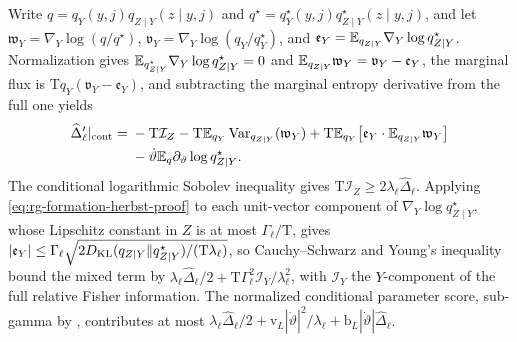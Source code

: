 Write \(q=q_Y(y,j)q_{Z\mid Y}(z\mid y,j)\) and
\(q^\star=q^\star_Y(y,j)q^\star_{Z\mid Y}(z\mid y,j)\), and let
\(\mathfrak w_Y=\nabla_Y\log(q/q^\star)\),
\(\mathfrak v_Y=\nabla_Y\log(q_Y/q^\star_Y)\), and
\(\mathfrak e_Y=\mathbb E_{q_{Z\mid Y}}\nabla_Y\log q^\star_{Z\mid Y}\). Normalization
gives \(\mathbb E_{q^\star_{Z\mid Y}}\nabla_Y\log q^\star_{Z\mid Y}=0\) and
\(\mathbb E_{q_{Z\mid Y}}\mathfrak w_Y=\mathfrak v_Y-\mathfrak e_Y\), the marginal
flux is \(\mathrm Tq_Y(\mathfrak v_Y-\mathfrak e_Y)\), and subtracting the
marginal entropy derivative from the full one yields
\begin{align}
 \widehat\Delta_\ell'|_{\mathrm{cont}}
 ={}&-\mathrm T\mathcal I_Z
      -\mathrm T\mathbb E_{q_Y}\operatorname{Var}_{q_{Z\mid Y}}(\mathfrak w_Y)
      +\mathrm T\mathbb E_{q_Y}\bigl[\mathfrak e_Y\cdot\mathbb E_{q_{Z\mid Y}}\mathfrak w_Y\bigr]
 \notag\\
 &-\dot\vartheta \mathbb E_q\partial_\vartheta\log q^\star_{Z\mid Y}.
 \label{eq:rg-formation-conditional-balance}
\end{align}
The conditional logarithmic Sobolev inequality gives
\(\mathrm T\mathcal I_Z\ge2\lambda_\ell\widehat\Delta_\ell\). Applying
\cref{eq:rg-formation-herbst-proof} to each unit-vector component of
\(\nabla_Y\log q^\star_{Z\mid Y}\), whose Lipschitz constant in \(Z\) is at most
\(\Gamma_\ell/\mathrm T\), gives
\(|\mathfrak e_Y|\le\Gamma_\ell\sqrt{2D_{\mathrm{KL}}(q_{Z\mid Y}\Vert q^\star_{Z\mid Y})/(\mathrm T\lambda_\ell)}\),
so Cauchy--Schwarz and Young's inequality bound the mixed term by
\(\lambda_\ell\widehat\Delta_\ell/2+\mathrm T\Gamma_\ell^2\mathcal I_Y/\lambda_\ell^2\),
with \(\mathcal I_Y\) the \(Y\)-component of the full relative Fisher
information. The normalized conditional parameter score, sub-gamma by
, contributes at most
\(\lambda_\ell\widehat\Delta_\ell/2+\mathrm v_L|\dot\vartheta|^2/\lambda_\ell
+\mathrm b_L|\dot\vartheta|\widehat\Delta_\ell\).

